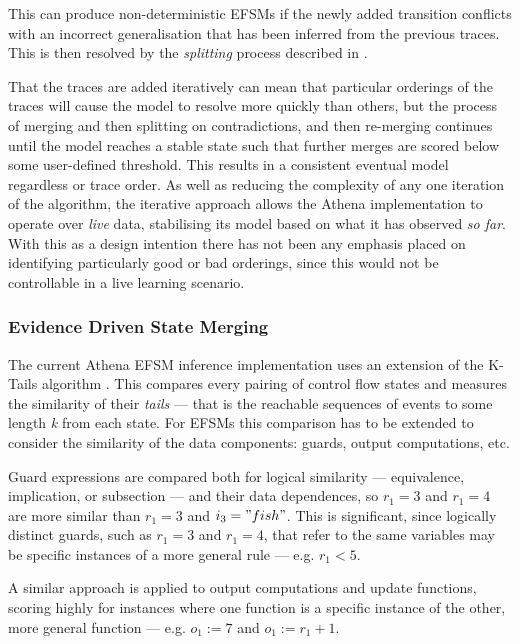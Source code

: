 This can produce non-deterministic EFSMs if the newly added transition conflicts with an incorrect generalisation that has been inferred from the previous traces. This is then resolved by the \emph{splitting} process described in .

That the traces are added iteratively can mean that particular orderings of the traces will cause the model to resolve more quickly than others, but the process of merging and then splitting on contradictions, and then re-merging continues until the model reaches a stable state such that further merges are scored below some user-defined threshold. This results in a consistent eventual model regardless or trace order. As well as reducing the complexity of any one iteration of the algorithm, the iterative approach allows the Athena implementation to operate over \emph{live} data, stabilising its model based on what it has observed \emph{so far}. With this as a design intention there has not been any emphasis placed on identifying particularly good or bad orderings, since this would not be controllable in a live learning scenario. 

\subsubsection{Evidence Driven State Merging}
\label{EDSM}

The current Athena EFSM inference implementation uses an extension of the K-Tails algorithm \cite{}. This compares every pairing of control flow states and measures the similarity of their \emph{tails} --- that is the reachable sequences of events to some length \emph{k} from each state. For EFSMs this comparison has to be extended to consider the similarity of the data components: guards, output computations, etc. 

Guard expressions are compared both for logical similarity --- equivalence, implication, or subsection --- and their data dependences, so $r_1 = 3$ and $r_1 = 4$ are more similar than $r_1 = 3$ and $i_3 = "fish"$. This is significant, since logically distinct guards, such as $r_1 = 3$ and $r_1 = 4$, that refer to the same variables may be specific instances of a more general rule --- e.g. $r_1 < 5$.

A similar approach is applied to output computations and update functions, scoring highly for instances where one function is a specific instance of the other, more general function --- e.g. $o_1 := 7$ and $o_1 := r_1 + 1$.

